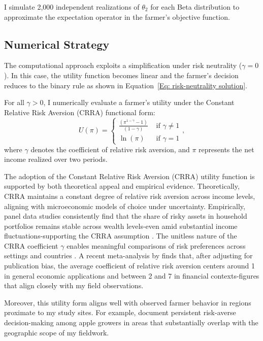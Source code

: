 I simulate 2,000 independent realizations of $\theta_2$ for each Beta distribution to approximate the expectation operator in the farmer's objective function.




\subsection{Numerical Strategy}
\noindent The computational approach exploits a simplification under risk neutrality ($\gamma = 0$). In this case, the utility function becomes linear and the farmer's decision reduces to the binary rule as shown in Equation~\ref{Eq: risk-neutrality solution}.

For all $\gamma > 0$, I numerically evaluate a farmer's utility under the Constant Relative Risk Aversion (CRRA) functional form:
\begin{equation}
U(\pi)=\left\{\begin{array}{ll}
\frac{\left(\pi^{1-\gamma}-1\right)}{(1-\gamma)} & \text { if } \gamma \neq 1 \\
\ln (\pi) & \text { if } \gamma=1
\end{array},\right.
\label{eq: CRRA}
\end{equation}
where $\gamma$ denotes the coefficient of relative risk aversion, and $\pi$ represents the net income realized over two periods. 

The adoption of the Constant Relative Risk Aversion (CRRA) utility function is supported by both theoretical appeal and empirical evidence. Theoretically, CRRA maintains a constant degree of relative risk aversion across income levels, aligning with microeconomic models of choice under uncertainty. Empirically, panel data studies consistently find that the share of risky assets in household portfolios remains stable across wealth levels-even amid substantial income fluctuations-supporting the CRRA assumption \citep{Berger2020Characterizing, chiappori2011relative, zavala2024unfair}. The unitless nature of the CRRA coefficient $\gamma$ enables meaningful comparisons of risk preferences across settings and countries \citep{Szpiro1986Relative, hardaker2000some}. A recent meta-analysis by \citet{Irsova2025Relative} finds that, after adjusting for publication bias, the average coefficient of relative risk aversion centers around 1 in general economic applications and between 2 and 7 in financial contexts-figures that align closely with my field observations.

Moreover, this utility form aligns well with observed farmer behavior in regions proximate to my study sites. For example, \citet{jin2024losses} document persistent risk-averse decision-making among apple growers in areas that substantially overlap with the geographic scope of my fieldwork.



